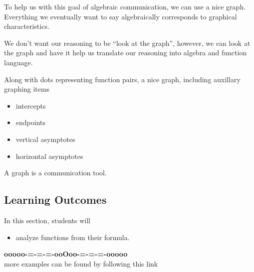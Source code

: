 \documentclass{ximera}
\begin{document}
To help us with this goal of algebraic communication, we can use a nice graph.  Everything we eventually want to say algebraically corresponds to graphical characteristics.

We don't want our reasoning to be ``look at the graph'', however, we can look at the graph and have it help us translate our reasoning into algebra and function language.





Along with dots representing function pairs, a nice graph, including auxillary graphing items
\begin{itemize}
	\item intercepts
	\item endpoints
	\item vertical asymptotes
	\item horizontal asymptotes
\end{itemize}





A graph is a communication tool.




\subsection*{Learning Outcomes}

\begin{sectionOutcomes}
In this section, students will 

\begin{itemize}
\item analyze functions from their formula.
\end{itemize}
\end{sectionOutcomes}














\begin{onlineOnly}
\begin{center}
\textbf{\textcolor{green!50!black}{ooooo-=-=-=-ooOoo-=-=-=-ooooo}} \\

more examples can be found by following this link\\ 

\end{center}
\end{onlineOnly}
\end{document}
